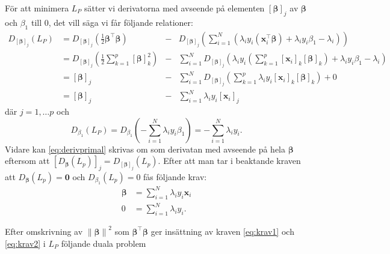 \documentclass[a4paper, 12pt]{report}
\theoremstyle{definition}
\theoremstyle{remark}
\newcommand{\bfbeta}{{\boldsymbol{\beta}}}
\begin{document}
För att minimera $L_P$ sätter vi derivatorna med avseende på elementen $\left[\bfbeta\right]_j$ av $\bfbeta$ och $\beta_1$ till 0, det vill säga vi får följande relationer:
\begin{equation}\label{eq:derivprimal}
\begin{aligned}
	D_{ \left[\bfbeta\right]_j } (L_P) &= D_{ \left[\bfbeta\right]_j } \left( \frac{1}{2} \bfbeta^\intercal \bfbeta \right) &- &D_{ \left[\bfbeta\right]_j } \left( \sum_{i=1}^{N} \left( \lambda_i y_i \left( \mathbf{x}_i^\intercal\bfbeta \right) + \lambda_i y_i \beta_1 - \lambda_i \right)\right)\\
	&= D_{ \left[\bfbeta\right]_j } \left( \frac{1}{2} \sum_{k=1}^{p} \left[\bfbeta\right]_k^2 \right) &- &\sum_{i=1}^{N} D_{ \left[\bfbeta\right]_j } \left(  \lambda_i y_i \left(\sum_{k=1}^{p}\left[\mathbf{x}_i\right]_k\left[\bfbeta\right]_k \right) + \lambda_i y_i \beta_1-\lambda_i \right)\\
	&= [\bfbeta]_j &- &\sum_{i=1}^{N} D_{ \left[\bfbeta\right]_j } \left( \sum_{k=1}^{p} \lambda_i y_i \left[\mathbf{x}_i\right]_k\left[\bfbeta\right]_k \right) + 0\\
	&= [\bfbeta]_j &- &\sum_{i=1}^{N}\lambda_i y_i \left[ \mathbf{x}_i \right]_j
\end{aligned}
\end{equation}
där $j=1,\dots p$ och
\begin{equation*}
	D_{\beta_1}(L_P) = D_{\beta_1}\left( -\sum_{i=1}^{N} \lambda_i y_i \beta_1 \right) = -\sum_{i=1}^{N} \lambda_i y_i.
\end{equation*}
Vidare kan \ref{eq:derivprimal} skrivas om som derivatan med avseende på hela $\bfbeta$ eftersom att $ \left[ D_{ \bfbeta }(L_p) \right]_j = D_{\left[ \bfbeta \right]_j}(L_p) $. Efter att man tar i beaktande kraven att $ D_{ \bfbeta }(L_p) = \mathbf{0} $ och $ D_{\beta_1}(L_p)=0 $ fås följande krav:
\begin{align}\label{eq:krav1}
	\bfbeta &= \sum_{i=1}^{N} \lambda_i y_i \mathbf{x}_i\\
	0 &= \sum_{i=1}^{N} \lambda_i y_i.\label{eq:krav2}
\end{align}

Efter omskrivning av $\left\| \bfbeta \right\|^2$ som $\bfbeta^\intercal\bfbeta$ ger insättning av kraven \ref{eq:krav1} och \ref{eq:krav2} i $L_P$ följande duala problem
\end{document}
